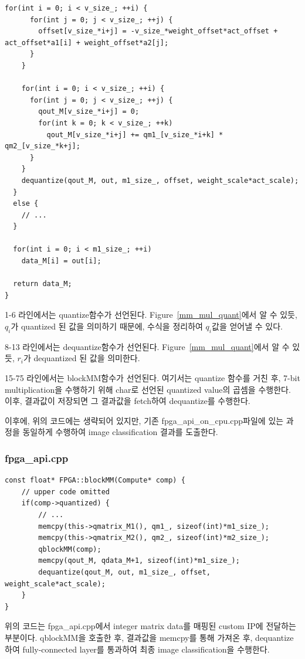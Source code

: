 \documentclass{article}
\begin{document}
\begin{lstlisting}[style={c-style}]
    for(int i = 0; i < v_size_; ++i) {
      for(int j = 0; j < v_size_; ++j) {    
        offset[v_size_*i+j] = -v_size_*weight_offset*act_offset + act_offset*a1[i] + weight_offset*a2[j];
      }
    }
    
    for(int i = 0; i < v_size_; ++i) {
      for(int j = 0; j < v_size_; ++j) {    
        qout_M[v_size_*i+j] = 0;
        for(int k = 0; k < v_size_; ++k)
          qout_M[v_size_*i+j] += qm1_[v_size_*i+k] * qm2_[v_size_*k+j];
      }
    }
    dequantize(qout_M, out, m1_size_, offset, weight_scale*act_scale);
  }
  else {
    // ...
  }

  for(int i = 0; i < m1_size_; ++i)
    data_M[i] = out[i];

  return data_M;    
}
\end{lstlisting}
\begin{itemize*}
    \item 1-6 라인에서는 quantize함수가 선언된다. Figure~\ref{mm_mul_quant}에서 알 수 있듯, $q_i$가 quantized 된 값을 의미하기 때문에, 수식을 정리하여 $q_i$값을 얻어낼 수 있다.
    \item 8-13 라인에서는 dequantize함수가 선언된다. Figure~\ref{mm_mul_quant}에서 알 수 있듯, $r_i$가 dequantized 된 값을 의미한다.
    \item 15-75 라인에서는 blockMM함수가 선언된다. 여기서는 quantize 함수를 거친 후, 7-bit multiplication을 수행하기 위해 char로 선언된 quantized value의 곱셈을 수행한다. 이후, 결과값이 저장되면 그 결과값을 fetch하여 dequantize를 수행한다.
    \item 이후에, 위의 코드에는 생략되어 있지만, 기존 fpga\_api\_on\_cpu.cpp파일에 있는 과정을 동일하게 수행하여 image classification 결과를 도출한다.
\end{itemize*}

\subsubsection*{fpga\_api.cpp}
\begin{lstlisting}[style={c-style}]
const float* FPGA::blockMM(Compute* comp) {
    // upper code omitted
    if(comp->quantized) {
        // ...
        memcpy(this->qmatrix_M1(), qm1_, sizeof(int)*m1_size_);
        memcpy(this->qmatrix_M2(), qm2_, sizeof(int)*m2_size_);
        qblockMM(comp);
        memcpy(qout_M, qdata_M+1, sizeof(int)*m1_size_);
        dequantize(qout_M, out, m1_size_, offset, weight_scale*act_scale);
    }
}
\end{lstlisting}
위의 코드는 fpga\_api.cpp에서 integer matrix data를 매핑된 custom IP에 전달하는 부분이다. qblockMM을 호출한 후, 결과값을 memcpy를 통해 가져온 후, dequantize하여 fully-connected layer를 통과하여 최종 image classification을 수행한다.
\end{document}
